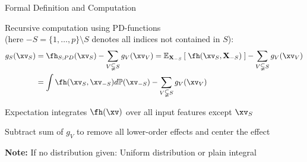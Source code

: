 \documentclass[10pt,compress,t,notes=noshow, xcolor=table]{beamer}
\newcommand{\Xv}{\mathbf{X}} %
\begin{document}
\begin{framev}[align=top]{Formal Definition and Computation
}
\begin{definition}
Recursive computation using PD-functions \\
(here $-S = \{1, \ldots, p \} \setminus S$ denotes all indices not contained in \(S\)):
\begin{align*}
g_{S}(\xv_S)
& = \fh_{S;PD}(\xv_S) - \sum_{V \subsetneqq S} g_V(\xv_V)
= \mathbb{E}_{\Xv_{-S}} \left[ \; \fh(\xv_S, \Xv_{-S}) \; \right] - \sum_{V \subsetneqq S} g_V(\xv_V) \\
& = \int \fh(\xv_S, \xv_{-S}) d \mathbb{P}(\xv_{-S}) - \sum_{V \subsetneqq S} g_V(\xv_V)
\end{align*}
\end{definition}
\begin{itemizeM}
\item Expectation integrates $\fh(\xv)$ over all input features except $\xv_S$
\item Subtract sum of $g_V$ to remove all lower-order effects and center the effect
\item \textbf{Note:} If no distribution given: Uniform distribution or plain integral
\end{itemizeM}
\end{framev}
\end{document}

